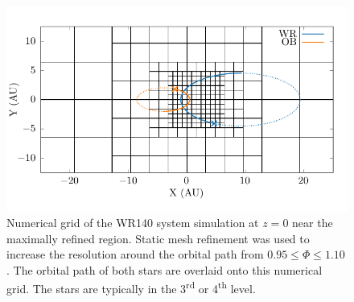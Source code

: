 \documentclass[fleqn,usenatbib]{mnras}
\newcommand{\ts}{\textsuperscript}
\begin{document}

\begin{figure}
  \centering
  \includegraphics[width=\linewidth]{assets/wr140-grid/grid-orbit.pdf}
  \caption[Numerical grid of the WR140 system simulation at $z=0$]{Numerical grid of the WR140 system simulation at $z=0$ near the maximally refined region. Static mesh refinement was used to increase the resolution around the orbital path from $0.95 \leq \Phi \leq 1.10$. The orbital path of both stars are overlaid onto this numerical grid. The stars are typically in the 3\ts{rd} or 4\ts{th} level.}
  \label{fig:p2-orbitalpath}
\end{figure}

\end{document}
